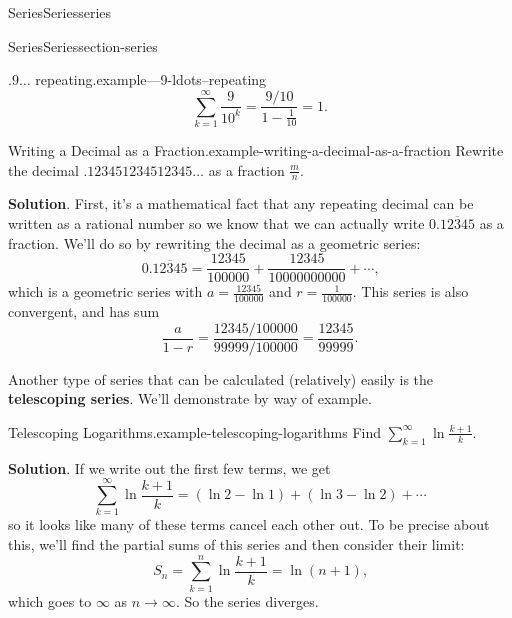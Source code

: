 \documentclass[oneside,10pt,]{book}
\newcommand{\terminology}[1]{\textbf{#1}}
\numberwithin{equation}{section}
\begin{document}
\begin{chapterptx}{Series}{}{Series}{}{}{series}
\begin{sectionptx}{Series}{}{Series}{}{}{section-series}
\begin{example}{\(.9\ldots\) repeating.}{example---9-ldots--repeating}
\begin{equation*}
\sum_{k=1}^{\infty}\frac{9}{10^{k}} = \frac{9/10}{1 - \frac{1}{10}} = 1\text{.}
\end{equation*}
%
\end{example}
\begin{example}{Writing a Decimal as a Fraction.}{example-writing-a-decimal-as-a-fraction}%
\hypertarget{p-850}{}%
Rewrite the decimal \(.123451234512345\ldots\) as a fraction \(\frac{m}{n}\).%
\par\smallskip%
\noindent\textbf{Solution}.\hypertarget{solution-176}{}\quad%
\hypertarget{p-851}{}%
First, it's a mathematical fact that any repeating decimal can be written as a rational number so we know that we can actually write \(0.\overline{12345}\) as a fraction. We'll do so by rewriting the decimal as a geometric series:%
\begin{equation*}
0.\overline{12345} = \frac{12345}{100000} + \frac{12345}{10000000000} + \cdots\text{,}
\end{equation*}
which is a geometric series with \(a = \frac{12345}{100000}\) and \(r = \frac{1}{100000}\). This series is also convergent, and has sum%
\begin{equation*}
\frac{a}{1 - r} = \frac{12345/100000}{99999/100000} = \frac{12345}{99999}\text{.}
\end{equation*}
%
\end{example}
\hypertarget{p-852}{}%
Another type of series that can be calculated (relatively) easily is the \terminology{telescoping series}. We'll demonstrate by way of example.%
\begin{example}{Telescoping Logarithms.}{example-telescoping-logarithms}%
\hypertarget{p-853}{}%
Find \(\sum_{k=1}^{\infty}\ln\frac{k + 1}{k}\).%
\par\smallskip%
\noindent\textbf{Solution}.\hypertarget{solution-177}{}\quad%
\hypertarget{p-854}{}%
If we write out the first few terms, we get%
\begin{equation*}
\sum_{k=1}^{\infty}\ln\frac{k + 1}{k} = (\ln2 - \ln 1) + (\ln3 - \ln2) + \cdots
\end{equation*}
so it looks like many of these terms cancel each other out. To be precise about this, we'll find the partial sums of this series and then consider their limit:%
\begin{equation*}
S_{n} = \sum_{k=1}^{n}\ln\frac{k+1}{k} = \ln(n + 1)\text{,}
\end{equation*}
which goes to \(\infty\) as \(n\to\infty\). So the series diverges.%
\end{example}

\end{sectionptx}
\end{chapterptx}
\end{document}
